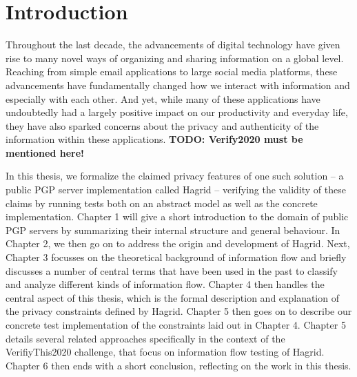 
\section{Introduction}
Throughout the last decade, the advancements of digital technology have given rise to many novel ways of organizing and sharing information on a global level.
Reaching from simple email applications to large social media platforms, these advancements have fundamentally changed how we interact with information and especially with each other.
And yet, while many of these applications have undoubtedly had a largely positive impact on our productivity and everyday life, they have also sparked concerns about the privacy and authenticity of the information within these applications. 
\textbf{TODO: Verify2020 must be mentioned here!}

In this thesis, we formalize the claimed privacy features of one such solution -- a public PGP server implementation called Hagrid -- verifying the validity of these claims by running tests both on an abstract model as well as the concrete implementation.
Chapter 1 will give a short introduction to the domain of public PGP servers by summarizing their internal structure and general behaviour. In Chapter 2, we then go on to address the origin and development of Hagrid. Next, Chapter 3 focusses on the theoretical background of information flow and briefly discusses a number of central terms that have been used in the past to classify and analyze different kinds of information flow.
Chapter 4 then handles the central aspect of this thesis, which is the formal description and explanation of the privacy constraints defined by Hagrid. Chapter 5 then goes on to describe our concrete test implementation of the constraints laid out in Chapter 4.
Chapter 5 details several related approaches specifically in the context of the VerifiyThis2020 challenge, that focus on information flow testing of Hagrid.
Chapter 6 then ends with a short conclusion, reflecting on the work in this thesis. 


\cite{austin2009efficient}
\cite{BanerjeeNR08}
\cite{callas1998openpgp}
\cite{chudnov2014information}
\cite{chudnov2018assuming}
\cite{claessen2011quickcheck}
\cite{Goguen_Meseguer_82}
\cite{Lourenco_Caires_15}
\cite{myers2001jif}
\cite{Zheng_Myers_07}
\cite{CVE_2019}